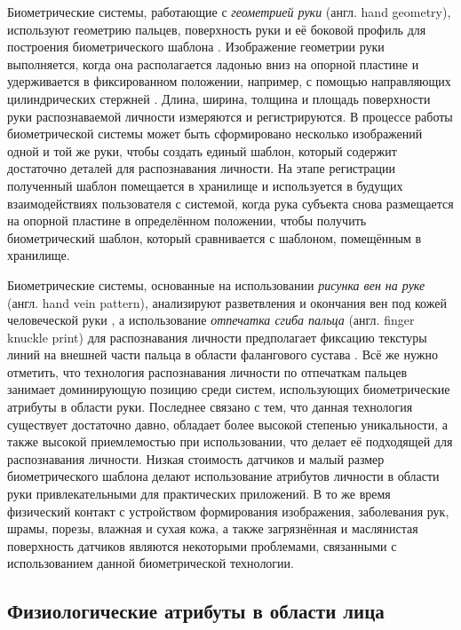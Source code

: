 \documentclass[12pt]{book}
\begin{document}
\large{Биометрические системы, работающие с \textit{геометрией руки} (англ. hand geometry), используют геометрию пальцев, поверхность руки и её боковой профиль для построения биометрического шаблона \cite{unar_2014, taher_2022}. Изображение геометрии руки выполняется, когда она располагается ладонью вниз на опорной пластине и удерживается в фиксированном положении, например, с помощью направляющих цилиндрических стержней \cite{taher_2022}. Длина, ширина, толщина и площадь поверхности руки распознаваемой личности измеряются и регистрируются. В процессе работы биометрической системы может быть сформировано несколько изображений одной и той же руки, чтобы создать единый шаблон, который содержит достаточно деталей для распознавания личности. На этапе регистрации полученный шаблон помещается в хранилище и используется в будущих взаимодействиях пользователя с системой, когда рука субъекта снова размещается на опорной пластине в определённом положении, чтобы получить биометрический шаблон, который сравнивается с шаблоном, помещённым в хранилище.}

\large{Биометрические системы, основанные на использовании \textit{рисунка вен на руке} (англ. hand vein pattern), анализируют разветвления и окончания вен под кожей человеческой руки \cite{unar_2014, tamimi_2019, hemis_2024}, а использование \textit{отпечатка сгиба пальца} (англ. finger knuckle print) для распознавания личности предполагает фиксацию текстуры линий на внешней части пальца в области фалангового сустава \cite{unar_2014, tarawneh_2022}. Всё же нужно отметить, что технология распознавания личности по отпечаткам пальцев занимает доминирующую позицию среди систем, использующих биометрические атрибуты в области руки. Последнее связано с тем, что данная технология существует достаточно давно, обладает более высокой степенью уникальности, а также высокой приемлемостью при использовании, что делает её подходящей для распознавания личности. Низкая стоимость датчиков и малый размер биометрического шаблона делают использование атрибутов личности в области руки привлекательными для практических приложений. В то же время физический контакт с устройством формирования изображения, заболевания рук, шрамы, порезы, влажная и сухая кожа, а также загрязнённая и маслянистая поверхность датчиков являются некоторыми проблемами, связанными с использованием данной биометрической технологии.}

\subsection{Физиологические атрибуты в области лица}
\end{document}
